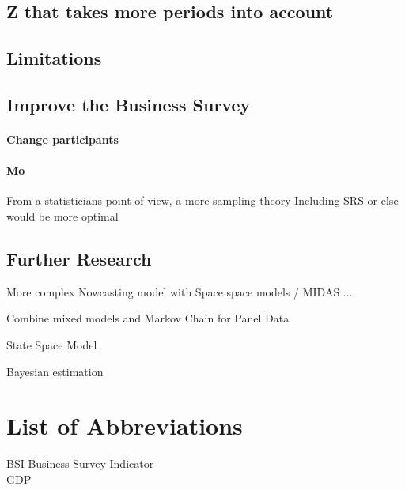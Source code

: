 \documentclass[12pt,a4paper,oneside]{book}
\begin{document}
\section*{Z that takes more periods into account}



\section*{Limitations}

\section*{Improve the Business Survey}

\subsubsection*{Change participants}

\subsubsection*{Mo}
From a statisticians point of view, a more sampling theory Including SRS or else would be more optimal

\section*{Further Research}



More complex Nowcasting model with Space space models / MIDAS ....

Combine mixed models and Markov Chain for Panel Data \citep{de_haan-rietdijk_use_2017} 

State Space Model

Bayesian estimation \cite{bialowolski_bayesian_nodate}

\nocite{hlavac_stargazer:_2018}


 

\chapter*{List of Abbreviations}
  BSI Business Survey Indicator \\
  GDP   \\
  
\begin{appendix}
  \listoffigures
  \listoftables
\end{appendix}
\end{document}

